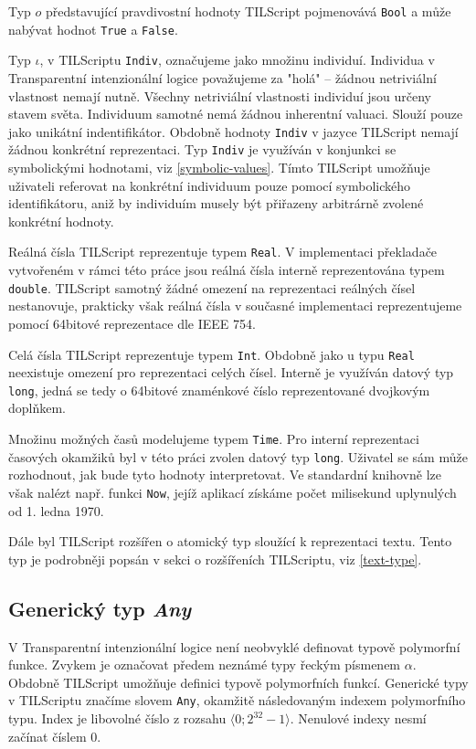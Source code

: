 Typ $o$ představující pravdivostní hodnoty TILScript pojmenovává \lstinline{Bool} a může nabývat
hodnot \lstinline{True} a \lstinline{False}.

Typ $\iota$, v TILScriptu \lstinline{Indiv}, označujeme jako množinu individuí. Individua
v Transparentní intenzionální logice považujeme za "holá" -- žádnou netriviální vlastnost nemají
nutně. Všechny netriviální vlastnosti individuí jsou určeny stavem světa. Individuum samotné nemá
žádnou inherentní valuaci. Slouží pouze jako unikátní indentifikátor. Obdobně hodnoty
\lstinline{Indiv} v jazyce TILScript nemají žádnou konkrétní reprezentaci. Typ \lstinline{Indiv}
je využíván v konjunkci se symbolickými hodnotami, viz \ref{symbolic-values}. Tímto TILScript
umožňuje uživateli referovat na konkrétní individuum pouze pomocí symbolického identifikátoru,
aniž by individuím musely být přiřazeny arbitrárně zvolené konkrétní hodnoty.

Reálná čísla TILScript reprezentuje typem \lstinline{Real}. V implementaci překladače vytvořeném
v rámci této práce jsou reálná čísla interně reprezentována typem \lstinline{double}. TILScript
samotný žádné omezení na reprezentaci reálných čísel nestanovuje, prakticky však reálná čísla
v současné implementaci reprezentujeme pomocí 64bitové reprezentace dle IEEE 754.

Celá čísla TILScript reprezentuje typem \lstinline{Int}. Obdobně jako u typu \lstinline{Real}
neexistuje omezení pro reprezentaci celých čísel. Interně je využíván datový typ \lstinline{long},
jedná se tedy o 64bitové znaménkové číslo reprezentované dvojkovým doplňkem.

Množinu možných časů modelujeme typem \lstinline{Time}. Pro interní reprezentaci časových okamžiků
byl v této práci zvolen datový typ \lstinline{long}. Uživatel se sám může rozhodnout, jak bude tyto
hodnoty interpretovat. Ve standardní knihovně lze však nalézt např. funkci \lstinline{Now}, jejíž
aplikací získáme počet milisekund uplynulých od 1. ledna 1970.

Dále byl TILScript rozšířen o atomický typ sloužící k reprezentaci textu. Tento typ je podrobněji
popsán v sekci o rozšířeních TILScriptu, viz \ref{text-type}.

\subsection{Generický typ \textit{Any}}

V Transparentní intenzionální logice není neobvyklé definovat typově polymorfní funkce. Zvykem je
označovat předem neznámé typy řeckým písmenem $\alpha$. Obdobně TILScript umožňuje definici
typově polymorfních funkcí. Generické typy v TILScriptu značíme slovem \lstinline{Any}, okamžitě
následovaným indexem polymorfního typu. Index je libovolné číslo z rozsahu
$\bigl \langle 0; 2^{32}-1 \bigr \rangle$. Nenulové indexy nesmí začínat číslem 0.

